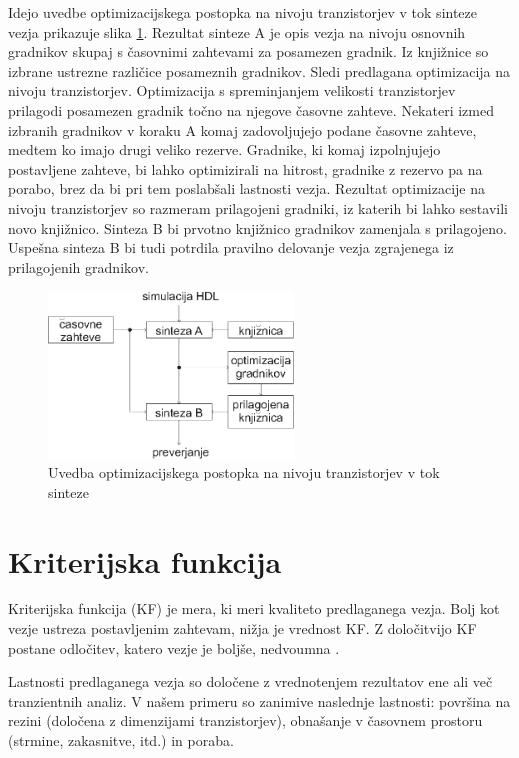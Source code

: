 \documentclass[journal,a4paper,twoside]{sty/IEEEtran}
\begin{document}
Idejo uvedbe optimizacijskega postopka na nivoju tranzistorjev v tok sinteze vezja prikazuje slika \ref{synthesis_step}. Rezultat sinteze A je opis vezja na nivoju osnovnih gradnikov skupaj s časovnimi zahtevami za posamezen gradnik. Iz knjižnice so izbrane ustrezne različice posameznih gradnikov. Sledi predlagana optimizacija na nivoju tranzistorjev. Optimizacija s spreminjanjem velikosti tranzistorjev prilagodi posamezen gradnik točno na njegove časovne zahteve. Nekateri izmed izbranih gradnikov v koraku A komaj zadovoljujejo podane časovne zahteve, medtem ko imajo drugi veliko rezerve. Gradnike, ki komaj izpolnjujejo postavljene zahteve, bi lahko optimizirali na hitrost, gradnike z rezervo pa na porabo, brez da bi pri tem poslabšali lastnosti vezja. Rezultat optimizacije na nivoju tranzistorjev so razmeram prilagojeni gradniki, iz katerih bi lahko sestavili novo knjižnico. Sinteza B bi prvotno knjižnico gradnikov zamenjala s prilagojeno. Uspešna sinteza B bi tudi potrdila pravilno delovanje vezja zgrajenega iz prilagojenih gradnikov.

\begin{figure}[htb]
\centerline{\includegraphics[width=6.5cm]{fig/synthesis_step_slo}}
\caption{Uvedba optimizacijskega postopka na nivoju tranzistorjev v tok sinteze}
\label{synthesis_step}
\end{figure}

\section{Kriterijska funkcija}
Kriterijska funkcija (KF) je mera, ki meri kvaliteto predlaganega vezja. Bolj kot vezje ustreza postavljenim zahtevam, nižja je vrednost KF. Z določitvijo KF postane odločitev, katero vezje je boljše, nedvoumna \cite{burmen1}.

Lastnosti predlaganega vezja so določene z vrednotenjem rezultatov ene ali več tranzientnih analiz. V našem primeru so zanimive naslednje lastnosti: površina na rezini (določena z dimenzijami tranzistorjev), obnašanje v časovnem prostoru (strmine, zakasnitve, itd.) in poraba.
\end{document}
